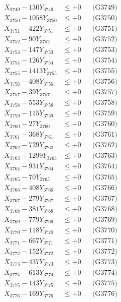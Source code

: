 \documentclass[a4paper,10pt]{article}
\begin{document}
{\begin{align}
X_{3749} - 130Y_{3749} &\leq +0 && \text{(G3749)} \\
X_{3750} - 1058Y_{3750} &\leq +0 && \text{(G3750)} \\
\allowbreak
X_{3751} - 422Y_{3751} &\leq +0 && \text{(G3751)} \\
X_{3752} - 90Y_{3752} &\leq +0 && \text{(G3752)} \\
X_{3753} - 147Y_{3753} &\leq +0 && \text{(G3753)} \\
X_{3754} - 126Y_{3754} &\leq +0 && \text{(G3754)} \\
X_{3755} - 1413Y_{3755} &\leq +0 && \text{(G3755)} \\
X_{3756} - 408Y_{3756} &\leq +0 && \text{(G3756)} \\
X_{3757} - 39Y_{3757} &\leq +0 && \text{(G3757)} \\
X_{3758} - 553Y_{3758} &\leq +0 && \text{(G3758)} \\
X_{3759} - 115Y_{3759} &\leq +0 && \text{(G3759)} \\
X_{3760} - 27Y_{3760} &\leq +0 && \text{(G3760)} \\
\allowbreak
X_{3761} - 368Y_{3761} &\leq +0 && \text{(G3761)} \\
X_{3762} - 729Y_{3762} &\leq +0 && \text{(G3762)} \\
X_{3763} - 1299Y_{3763} &\leq +0 && \text{(G3763)} \\
X_{3764} - 931Y_{3764} &\leq +0 && \text{(G3764)} \\
X_{3765} - 70Y_{3765} &\leq +0 && \text{(G3765)} \\
X_{3766} - 408Y_{3766} &\leq +0 && \text{(G3766)} \\
X_{3767} - 279Y_{3767} &\leq +0 && \text{(G3767)} \\
X_{3768} - 381Y_{3768} &\leq +0 && \text{(G3768)} \\
X_{3769} - 779Y_{3769} &\leq +0 && \text{(G3769)} \\
X_{3770} - 118Y_{3770} &\leq +0 && \text{(G3770)} \\
\allowbreak
X_{3771} - 667Y_{3771} &\leq +0 && \text{(G3771)} \\
X_{3772} - 152Y_{3772} &\leq +0 && \text{(G3772)} \\
X_{3773} - 437Y_{3773} &\leq +0 && \text{(G3773)} \\
X_{3774} - 613Y_{3774} &\leq +0 && \text{(G3774)} \\
X_{3775} - 143Y_{3775} &\leq +0 && \text{(G3775)} \\
X_{3776} - 169Y_{3776} &\leq +0 && \text{(G3776)} \\

\end{align}}
\end{document}
